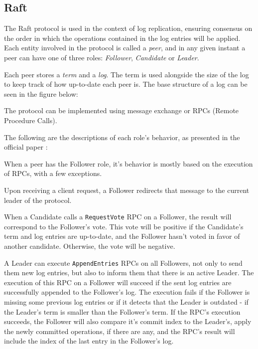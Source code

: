 \subsection{Raft}

The Raft protocol \cite{raft} is used in the context of log replication, ensuring consensus on the order in which the operations contained in the log entries will be applied. Each entity involved in the protocol is called a \textit{peer}, and in any given instant a peer can have one of three roles: \textit{Follower}, \textit{Candidate} or \textit{Leader}.

Each peer stores a \textit{term} and a \textit{log}. The term is used alongside the size of the log to keep track of how up-to-date each peer is. The base structure of a log can be seen in the figure below:


The protocol can be implemented using message exchange or RPCs (Remote Procedure Calls). 

The following are the descriptions of each role’s behavior, as presented in the official paper \cite{raft}:

When a peer has the Follower role, it’s behavior is mostly based on the execution of RPCs, with a few exceptions.

Upon receiving a client request, a Follower redirects that message to the current leader of the protocol.

When a Candidate calls a \texttt{RequestVote} RPC on a Follower, the result will correspond to the Follower’s vote. This vote will be positive if the Candidate’s term and log entries are up-to-date, and the Follower hasn’t voted in favor of another candidate. Otherwise, the vote will be negative.

A Leader can execute \texttt{AppendEntries} RPCs on all Followers, not only to send them new log entries, but also to inform them that there is an active Leader. The execution of this RPC on a Follower will succeed if the sent log entries are successfully appended to the Follower’s log. The execution fails if the Follower is missing some previous log entries or if it detects that the Leader is outdated - if the Leader’s term is smaller than the Follower’s term. If the RPC’s execution succeeds, the Follower will also compare it’s commit index to the Leader’s, apply the newly committed operations, if there are any, and the RPC’s result will include the index of the last entry in the Follower’s log.

